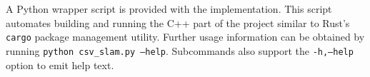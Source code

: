 A Python wrapper script is provided with the implementation. This script automates building and running the C++ part of the project similar to Rust's \texttt{cargo} package management utility. Further usage information can be obtained by running \texttt{python csv\_slam.py --help}. Subcommands also support the \texttt{-h,--help} option to emit help text.
